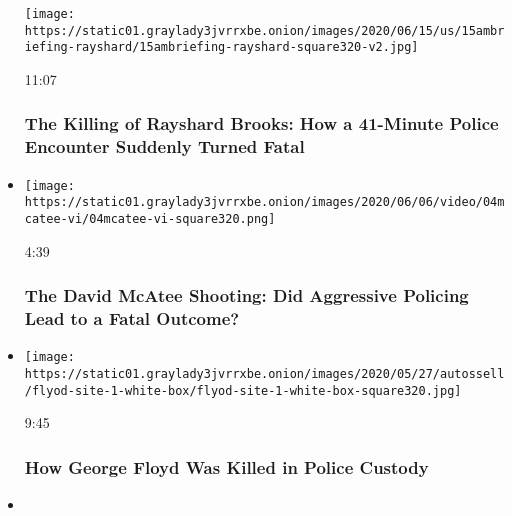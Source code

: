 \begin{itemize}
  \texttt{[image: https://static01.graylady3jvrrxbe.onion/images/2020/06/15/us/15ambriefing-rayshard/15ambriefing-rayshard-square320-v2.jpg]}

  11:07

  \hypertarget{the-killing-of-rayshard-brooks-how-a-41-minute-police-encounter-suddenly-turned-fatal}{%
  \subsubsection{The Killing of Rayshard Brooks: How a 41-Minute Police
  Encounter Suddenly Turned
  Fatal}\label{the-killing-of-rayshard-brooks-how-a-41-minute-police-encounter-suddenly-turned-fatal}}
\item
  \href{https://www.nytimes3xbfgragh.onion/video/us/100000007175316/the-david-mcatee-shooting-did-aggressive-policing-lead-to-a-fatal-outcome.html?action=click\&module=video-series-bar\&region=header\&pgtype=Article\&playlistId=video/investigations}{}

  \texttt{[image: https://static01.graylady3jvrrxbe.onion/images/2020/06/06/video/04mcatee-vi/04mcatee-vi-square320.png]}

  4:39

  \hypertarget{the-david-mcatee-shooting-did-aggressive-policing-lead-to-a-fatal-outcome}{%
  \subsubsection{The David McAtee Shooting: Did Aggressive Policing Lead
  to a Fatal
  Outcome?}\label{the-david-mcatee-shooting-did-aggressive-policing-lead-to-a-fatal-outcome}}
\item
  \href{https://www.nytimes3xbfgragh.onion/video/us/100000007159353/george-floyd-arrest-death-video.html?action=click\&module=video-series-bar\&region=header\&pgtype=Article\&playlistId=video/investigations}{}

  \texttt{[image: https://static01.graylady3jvrrxbe.onion/images/2020/05/27/autossell/flyod-site-1-white-box/flyod-site-1-white-box-square320.jpg]}

  9:45

  \hypertarget{how-george-floyd-was-killed-in-police-custody}{%
  \subsubsection{How George Floyd Was Killed in Police
  Custody}\label{how-george-floyd-was-killed-in-police-custody}}
\item
  \href{https://www.nytimes3xbfgragh.onion/video/us/100000007142853/ahmaud-arbery-video-911-georgia.html?action=click\&module=video-series-bar\&region=header\&pgtype=Article\&playlistId=video/investigations}{}


\end{itemize}
